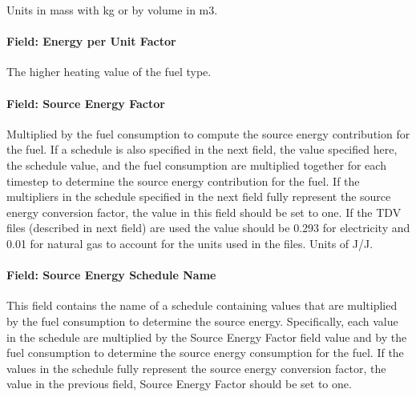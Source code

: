 Units in mass with kg or by volume in m3.

\paragraph{Field: Energy per Unit Factor}\label{field-energy-per-unit-factor}

The higher heating value of the fuel type.

\paragraph{Field: Source Energy Factor}\label{field-source-energy-factor}

Multiplied by the fuel consumption to compute the source energy contribution for the fuel. If a schedule is also specified in the next field, the value specified here, the schedule value, and the fuel consumption are multiplied together for each timestep to determine the source energy contribution for the fuel. If the multipliers in the schedule specified in the next field fully represent the source energy conversion factor, the value in this field should be set to one. If the TDV files (described in next field) are used the value should be 0.293 for electricity and 0.01 for natural gas to account for the units used in the files. Units of J/J.

\paragraph{Field: Source Energy Schedule Name}\label{field-source-energy-schedule-name}

This field contains the name of a schedule containing values that are multiplied by the fuel consumption to determine the source energy. Specifically, each value in the schedule are multiplied by the Source Energy Factor field value and by the fuel consumption to determine the source energy consumption for the fuel. If the values in the schedule fully represent the source energy conversion factor, the value in the previous field, Source Energy Factor should be set to one.

